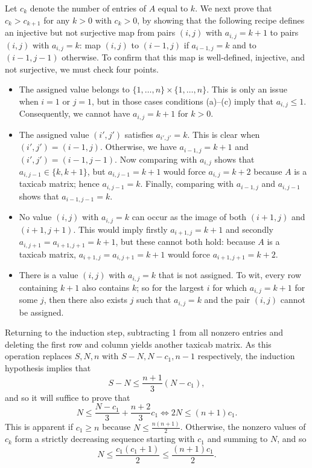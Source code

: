 \documentclass[amssymb,twocolumn,pra,10pt,aps]{revtex4-1}
\begin{document}
\begin{itemize}
Let $c_k$ denote the number of entries of $A$ equal to $k$.
We next prove that $c_k > c_{k+1}$ for any $k>0$ with $c_k > 0$,
by showing that the following recipe defines
an injective but not surjective map from pairs $(i,j)$ with $a_{i,j}=k+1$
to pairs $(i,j)$ with $a_{i,j} = k$: map $(i,j)$ to $(i-1,j)$ if $a_{i-1,j} = k$ and to $(i-1,j-1)$ otherwise. To confirm that this map is well-defined, injective, and not surjective, we must check four points.
\begin{itemize}
\item
The assigned value belongs to $\{1,\dots,n\} \times \{1,\dots,n\}$. 
This is only an issue when $i=1$ or $j=1$, but in those cases conditions (a)--(c) imply that $a_{i,j} \leq 1$. Consequently, we cannot have $a_{i,j} = k+1$ for $k>0$.
\item
The assigned value $(i',j')$ satisfies $a_{i',j'} = k$. This is clear when $(i',j') = (i-1,j)$.
Otherwise, we have $a_{i-1,j} = k+1$ and $(i',j') = (i-1,j-1)$. 
Now comparing with $a_{i,j}$ shows that $a_{i,j-1} \in \{k,k+1\}$, but $a_{i,j-1} =k+1$ would force $a_{i,j} = k+2$ because $A$ is a taxicab matrix;
hence $a_{i,j-1} = k$.
Finally, comparing with $a_{i-1,j}$ and $a_{i,j-1}$ shows that $a_{i-1,j-1} = k$.
\item
No value $(i,j)$ with $a_{i,j} = k$ can occur as the image of both $(i+1,j)$ and $(i+1,j+1)$.
This would imply firstly $a_{i+1,j} = k+1$ and secondly $a_{i,j+1} = a_{i+1,j+1} = k+1$, but these cannot both hold: because $A$ is a taxicab matrix, $a_{i+1,j} = a_{i,j+1} = k+1$ would force $a_{i+1,j+1} = k+2$.
\item
There is a value $(i,j)$ with $a_{i,j}=k$ that is not assigned. 
To wit, every row containing $k+1$ also contains $k$; so for the largest $i$ for which $a_{i,j} = k+1$ for some $j$, then there also exists $j$ such that $a_{i,j} = k$ and the pair $(i,j)$ cannot be assigned.
\end{itemize}

Returning to the induction step, subtracting 1 from all nonzero entries and deleting the first row and column yields another taxicab matrix. As this operation replaces $S, N, n$ with $S-N, N-c_1, n-1$ respectively, the induction hypothesis implies that
\[
S-N \leq \frac{n+1}{3}(N-c_1),
\]
and so it will suffice to prove that 
\[
N \leq \frac{N-c_1}{3} + \frac{n+2}{3}c_1 \Longleftrightarrow 2N \leq (n+1)c_1.
\]
This is apparent if $c_1 \geq n$ because $N \leq \tfrac{n(n+1)}{2}$.
Otherwise, the nonzero values of $c_k$ form a strictly decreasing sequence starting with $c_1$ and summing to $N$, and so
\[
N \leq \frac{c_1(c_1+1)}{2} \leq \frac{(n+1)c_1}{2}.
\]


\end{itemize}
\end{document}
